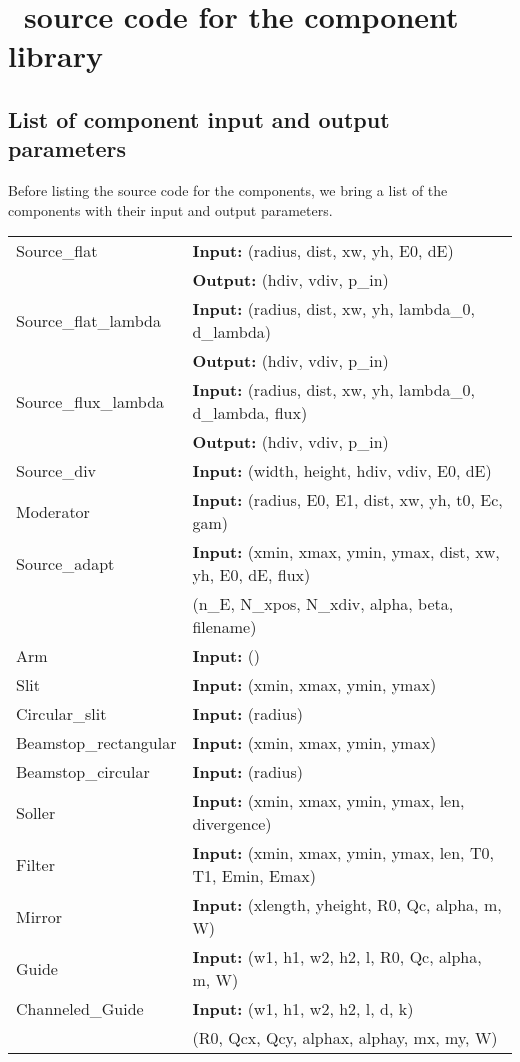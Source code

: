
\chapter{\MCS\ source code for the component library}
\label{compcode}

\section*{List of component input and output parameters}

Before listing the source code for the components, we
bring a list of the components with their input and output parameters.

\begin{center}
\begin{tabular}{|ll|}
\hline
Source\_flat & \textbf{Input:} (radius, dist, xw, yh, E0, dE) \\
 & \textbf{Output:} (hdiv, vdiv, p\_in) \\
\hline
Source\_flat\_lambda & \textbf{Input:} (radius, dist, xw, yh, lambda\_0, d\_lambda) \\
 & \textbf{Output:} (hdiv, vdiv, p\_in) \\
\hline
Source\_flux\_lambda & \textbf{Input:} (radius, dist, xw, yh, lambda\_0,
    d\_lambda, flux) \\
 & \textbf{Output:} (hdiv, vdiv, p\_in) \\
\hline
Source\_div & \textbf{Input:} (width, height, hdiv, vdiv, E0, dE) \\
\hline
Moderator & \textbf{Input:} (radius, E0, E1, dist, xw, yh, t0, Ec, gam) \\
\hline
Source\_adapt & \textbf{Input:} (xmin, xmax, ymin, ymax, dist, xw, yh, E0, dE, flux) \\
     & \phantom{\textbf{Input:}\ }(n\_E, N\_xpos, N\_xdiv, alpha, beta, filename) \\
\hline
Arm & \textbf{Input:} () \\
\hline
Slit & \textbf{Input:} (xmin, xmax, ymin, ymax) \\
\hline
Circular\_slit & \textbf{Input:} (radius) \\
\hline
Beamstop\_rectangular & \textbf{Input:} (xmin, xmax, ymin, ymax) \\
\hline
Beamstop\_circular & \textbf{Input:} (radius) \\
\hline
Soller & \textbf{Input:} (xmin, xmax, ymin, ymax, len, divergence) \\
\hline
Filter & \textbf{Input:} (xmin, xmax, ymin, ymax, len, T0, T1, Emin, Emax) \\
\hline
Mirror & \textbf{Input:} (xlength, yheight, R0, Qc, alpha, m, W) \\
\hline
Guide & \textbf{Input:} (w1, h1, w2, h2, l, R0, Qc, alpha, m, W) \\
\hline
Channeled\_Guide & \textbf{Input:} (w1, h1, w2, h2, l, d, k) \\
                 & \phantom{\textbf{Input:}\ }(R0, Qcx, Qcy, alphax, alphay, mx, my, W) \\
\hline
\end{tabular}
\end{center}
